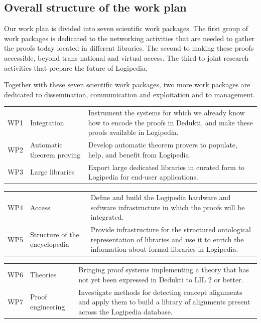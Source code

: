 \subsection{Overall structure of the work plan}

Our work plan is divided into seven scientific work packages.  The
first group of work packages is dedicated to the networking activities
that are needed to gather the proofs today located in different
libraries.  The second to making these proofs accessible, beyond
trans-national and virtual access.  The third to joint research
activities that prepare the future of Logipedia.

Together with these seven scientific work packages, two more work
packages are dedicated to dissemination, communication and
exploitation and to management.


\begin{longtable}{|p{}|p{}|p{}|}
\hline
\rowcolor{color2}\multicolumn{3}{|l|}{\bf Networking activities:}\\
\hline
WP1
&
Integration
&
Instrument the systems for which we already know how to encode the
proofs in Dedukti, and make these proofs available in Logipedia.
\\
\hline
WP2
&
Automatic theorem proving
& 
Develop automatic theorem provers to populate,
help, and benefit from Logipedia.
\\
\hline
WP3
&
Large libraries
&
Export large dedicated libraries in curated form 
to Logipedia for end-user applications.
\\
\hline
\end{longtable}

\begin{longtable}{|p{}|p{}|p{}|}
\hline
\rowcolor{color2}\multicolumn{3}{|l|}{\bf Trans-national and virtual access:}\\
\hline
WP4
&
Access
&
Define and build the Logipedia hardware and software infrastructure in
which the proofs will be integrated.
\\
\hline
WP5
&
Structure of the encyclopedia
&
Provide infrastructure for the structured ontological representation
of libraries and use it to enrich the information about formal
libraries in Logipedia.
\\
\hline
\end{longtable}


\begin{longtable}{|p{}|p{}|p{}|}
\hline
\rowcolor{color2}\multicolumn{3}{|l|}{\bf Joint research activities:}\\
\hline
WP6
&
Theories
&
Bringing proof systems implementing a theory 
that has not yet been expressed in Dedukti to LIL 2 or better.
\\
\hline
WP7
&
Proof engineering
&
Investigate methods for detecting concept alignments and apply
them to build a library of alignments present across the Logipedia database.
\\
\hline
\end{longtable}

